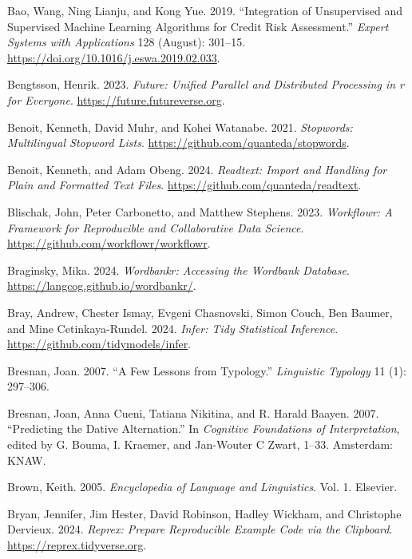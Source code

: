\documentclass[
  letterpaper,
]{latex/krantz}
\newlength{\cslhangindent}
\newenvironment{CSLReferences}[2] %
 {\begin{list}{}{%
  \setlength{\itemindent}{0pt}
  \setlength{\leftmargin}{0pt}
  \setlength{\parsep}{0pt}
  \ifodd #1
   \setlength{\leftmargin}{\cslhangindent}
   \setlength{\itemindent}{-1\cslhangindent}
  \fi
  \setlength{\itemsep}{#2\baselineskip}}}
 {\end{list}}
\theoremstyle{definition}
\theoremstyle{remark}
\begin{document}
\begin{CSLReferences}{1}{0}
Bao, Wang, Ning Lianju, and Kong Yue. 2019. {``Integration of
Unsupervised and Supervised Machine Learning Algorithms for Credit Risk
Assessment.''} \emph{Expert Systems with Applications} 128 (August):
301--15. \url{https://doi.org/10.1016/j.eswa.2019.02.033}.

Bengtsson, Henrik. 2023. \emph{Future: Unified Parallel and Distributed
Processing in r for Everyone}. \url{https://future.futureverse.org}.

Benoit, Kenneth, David Muhr, and Kohei Watanabe. 2021. \emph{Stopwords:
Multilingual Stopword Lists}.
\url{https://github.com/quanteda/stopwords}.

Benoit, Kenneth, and Adam Obeng. 2024. \emph{Readtext: Import and
Handling for Plain and Formatted Text Files}.
\url{https://github.com/quanteda/readtext}.

Blischak, John, Peter Carbonetto, and Matthew Stephens. 2023.
\emph{Workflowr: A Framework for Reproducible and Collaborative Data
Science}. \url{https://github.com/workflowr/workflowr}.

Braginsky, Mika. 2024. \emph{Wordbankr: Accessing the Wordbank
Database}. \url{https://langcog.github.io/wordbankr/}.

Bray, Andrew, Chester Ismay, Evgeni Chasnovski, Simon Couch, Ben Baumer,
and Mine Cetinkaya-Rundel. 2024. \emph{Infer: Tidy Statistical
Inference}. \url{https://github.com/tidymodels/infer}.

Bresnan, Joan. 2007. {``A Few Lessons from Typology.''} \emph{Linguistic
Typology} 11 (1): 297--306.

Bresnan, Joan, Anna Cueni, Tatiana Nikitina, and R. Harald Baayen. 2007.
{``Predicting the Dative Alternation.''} In \emph{Cognitive Foundations
of Interpretation}, edited by G. Bouma, I. Kraemer, and Jan-Wouter C
Zwart, 1--33. Amsterdam: KNAW.

Brown, Keith. 2005. \emph{Encyclopedia of Language and Linguistics}.
Vol. 1. Elsevier.

Bryan, Jennifer, Jim Hester, David Robinson, Hadley Wickham, and
Christophe Dervieux. 2024. \emph{Reprex: Prepare Reproducible Example
Code via the Clipboard}. \url{https://reprex.tidyverse.org}.


\end{CSLReferences}
\end{document}
